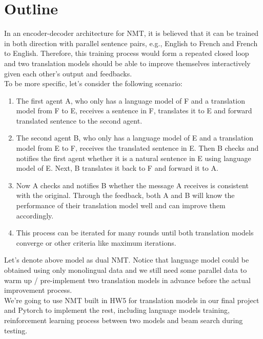 \documentclass[11pt]{article}
\begin{document}
{\part{Outline}
In an encoder-decoder architecture for NMT, it is believed that it can be trained in both direction with parallel sentence pairs, e.g., English to French and French to English. Therefore, this training process would form a repeated closed loop and two translation models should be able to improve themselves interactively given each other's output and feedbacks.
\\
\newline
\indent To be more specific, let's consider the following scenario:
\begin{enumerate}[label*=\arabic*.]
\item The first agent A, who only has a language model of F and a translation model from F to E, receives a sentence in F, translates it to E and forward translated sentence to the second agent.

\item The second agent B, who only has a language model of E and a translation model from E to F, receives the translated sentence in E. Then B checks and notifies the first agent whether it is a natural sentence in E using language model of E. Next, B translates it back to F and forward it to A.

\item Now A checks and notifies B whether the message A receives is consistent with the original. Through the feedback, both A and B will know the performance of their translation model well and can improve them accordingly.

\item This process can be iterated for many rounds until both translation models converge or other criteria like maximum iterations.
\end{enumerate}
\indent \indent  Let's denote above model as dual NMT. Notice that language model could be obtained using only monolingual data and we still need some parallel data to warm up / pre-implement two translation models in advance before the actual improvement process.
\\
\newline
\indent We're going to use NMT built in HW5 for translation models in our final project and Pytorch to implement the rest, including language models training,  reinforcement learning process between two models and beam search during testing.

}
\end{document}
